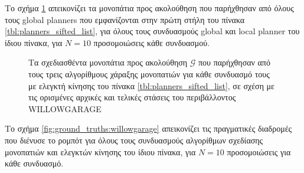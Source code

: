 Το σχήμα \ref{fig:global_plans:willowgarage} απεικονίζει τα μονοπάτια προς
ακολούθηση που παρήχθησαν από όλους τους global planners που εμφανίζονται στην
πρώτη στήλη του πίνακα \ref{tbl:planners_sifted_list}, για όλους τους
συνδυασμούς global και local planner του ίδιου πίνακα, για $N=10$ προσομοιώσεις
κάθε συνδυασμού.

\begin{figure}
\raggedright
  \begin{subfigure}[t]{\linewidth}
    \centering
    
  \end{subfigure}%
  \vspace{-1.5cm}
  \begin{subfigure}[t]{\linewidth}
    \centering
    
  \end{subfigure}%
  \vspace{-1.5cm}
  \begin{subfigure}[t]{\linewidth}
    \centering
    
  \end{subfigure}%
  \caption{\small Τα σχεδιασθέντα μονοπάτια προς ακολούθηση $\bm{\mathcal{G}}$
           που παρήχθησαν από τους τρεις αλγορίθμους χάραξης μονοπατιών για
           κάθε συνδυασμό τους με ελεγκτή κίνησης του πίνακα
           \ref{tbl:planners_sifted_list}, σε σχέση με τις ορισμένες αρχικές και
           τελικές στάσεις του περιβάλλοντος WILLOWGARAGE}
  \label{fig:global_plans:willowgarage}
\end{figure}

Το σχήμα \ref{fig:ground_truths:willowgarage} απεικονίζει τις πραγματικές
διαδρομές που διένυσε το ρομπότ για όλους τους συνδυασμούς αλγορίθμων σχεδίασης
μονοπατιών και ελεγκτών κίνησης του ίδιου πίνακα, για $N=10$ προσομοιώσεις για
κάθε συνδυασμό.

